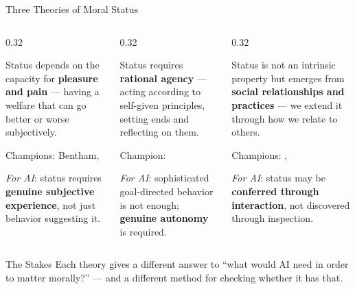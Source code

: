 \documentclass[aspectratio=169,11pt]{beamer}
\begin{document}
\begin{frame}[shrink=3]{Three Theories of Moral Status}
\begin{columns}[T]
\begin{column}{0.32\textwidth}
\begin{conceptbox}
\scriptsize
Status depends on the capacity for \textbf{pleasure and pain} --- having a welfare that can go better or worse subjectively.

\vspace{0.1cm}
Champions: Bentham, \textcite{singer_animal_liberation}

\vspace{0.1cm}
\textit{For AI}: status requires \textbf{genuine subjective experience}, not just behavior suggesting it.
\end{conceptbox}
\end{column}
\begin{column}{0.32\textwidth}
\begin{conceptbox}
\scriptsize
Status requires \textbf{rational agency} --- acting according to self-given principles, setting ends and reflecting on them.

\vspace{0.1cm}
Champion: \textcite{kant_groundwork}

\vspace{0.1cm}
\textit{For AI}: sophisticated goal-directed behavior is not enough; \textbf{genuine autonomy} is required.
\end{conceptbox}
\end{column}
\begin{column}{0.32\textwidth}
\begin{conceptbox}
\scriptsize
Status is not an intrinsic property but emerges from \textbf{social relationships and practices} --- we extend it through how we relate to others.

\vspace{0.1cm}
Champions: \textcite{gunkel_robot_rights}, \textcite{darling_new_breed}

\vspace{0.1cm}
\textit{For AI}: status may be \textbf{conferred through interaction}, not discovered through inspection.
\end{conceptbox}
\end{column}
\end{columns}

\vspace{0.2cm}
\begin{alertblock}{The Stakes}
\scriptsize
Each theory gives a different answer to ``what would AI need in order to matter morally?'' --- and a different method for checking whether it has that.
\end{alertblock}
\end{frame}
\end{document}

